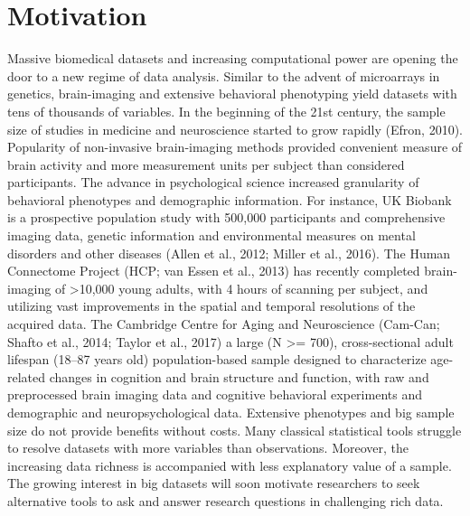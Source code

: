 \section{Motivation}
\label{ch:methods:motivation}
Massive biomedical datasets and increasing computational power are opening the door to a new regime of data analysis. Similar to the advent of microarrays in genetics, brain-imaging and extensive behavioral phenotyping yield datasets with tens of thousands of variables. In the beginning of the 21st  century, the sample size of studies in medicine and neuroscience started to grow rapidly (Efron, 2010). Popularity of non-invasive brain-imaging methods provided convenient measure of brain activity and more measurement units per subject than considered participants. The advance in psychological science increased granularity of behavioral phenotypes and demographic information. For instance, UK Biobank is a prospective population study with 500,000 participants and comprehensive imaging data, genetic information and environmental measures on mental disorders and other diseases (Allen et al., 2012; Miller et al., 2016). The Human Connectome Project (HCP; van Essen et al., 2013) has recently completed brain-imaging of >10,000 young adults, with 4 hours of scanning per subject, and utilizing vast improvements in the spatial and temporal resolutions of the acquired data. The Cambridge Centre for Aging and Neuroscience (Cam-Can; Shafto et al., 2014; Taylor et al., 2017) a large (N >= 700), cross-sectional adult lifespan (18--87 years old) population-based sample designed to characterize age-related changes in cognition and brain structure and function, with raw and preprocessed brain imaging data and cognitive behavioral experiments and demographic and neuropsychological data. Extensive phenotypes and big sample size do not provide benefits without costs. Many classical statistical tools struggle to resolve datasets with more variables than observations. Moreover, the increasing data richness is accompanied with less explanatory value of a sample. The growing interest in big datasets will soon motivate researchers to seek alternative tools to ask and answer research questions in challenging rich data. 

